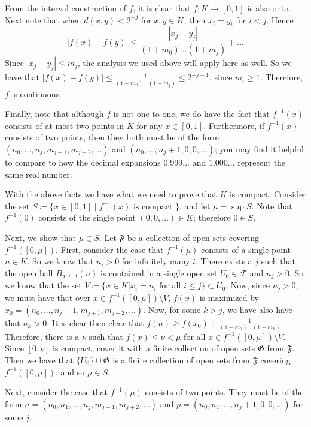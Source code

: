From the interval construction of \(f\), it is clear that \(f: K \to [0, 1]\) is also onto. Next note that
when \(d(x, y) < 2^{-j}\) for \(x,y \in K\), then \(x_i = y_i\) for \(i < j\). Hence
\begin{equation}
|f(x) - f(y)| \leq \frac{|x_j - y_j|}{(1 + m_0)...(1 + m_j)} + ...
\end{equation} 
Since \(|x_j - y_j| \leq m_j\), the analysis we used above will apply here as well. So we have that
\(|f(x) - f(y)| \leq \frac{1}{(1 + m_0)...(1 + m_j)} \leq 2^{-j-1}\), since \(m_i \geq 1\). Therefore,
\(f\) is continuous.

Finally, note that although \(f\) is not one to one, we do have the fact that \(f^{-1}(x)\) consists of at most
two points in \(K\) for any \(x \in [0, 1]\). Furthermore, if \(f^{-1}(x)\) consists of two points, then
they both must be of the form
\((n_0, ..., n_j, m_{j+1}, m_{j+2}, ...)\) and \((n_0, ..., n_j + 1, 0, 0, ...)\);
you may find it helpful to compare to how the decimal expansions \(0.999...\) and \(1.000...\)
represent the same real number.

With the above facts we have what we need to prove that \(K\) is compact. Consider the set
\(S \coloneqq \{x \in [0, 1] \mid f^{-1}(x) \text{ is compact }\}\), and let \(\mu = \sup S\). Note that
\(f^{-1}(0)\) consists of the single point \((0,0,...)\in K\); therefore \(0 \in S\). 

Next, we show that \(\mu \in S\). Let \(\mathfrak F\) be a collection of open sets covering \(f^{-1}([0, \mu])\).
First, consider the case that \(f^{-1}(\mu)\) consists of a single point \(n \in K\). So we know that
\(n_i > 0\) for infinitely many \(i\). There exists a \(j\) such that the open ball \(B_{2^{-j-1}}(n)\) is
contained in a single open set \(U_0 \in \mathcal F\) and \(n_j > 0\). So we know that the set 
\(V \coloneqq \{x \in K | x_i = n_i \text{ for all } i\leq j\} \subset U_0\). Now, since \(n_j > 0\), we
must have that over \(x \in f^{-1}([0, \mu]) \setminus V\), \(f(x)\) is maximized by 
\(x_0 = (n_0, ..., n_j - 1, m_{j+1}, m_{j+2}, ...)\). Now, for some \(k > j\), we have also have that \(n_k > 0\).
It is clear then clear that \(f(n) \geq f(x_0) + \frac{1}{(1+m_0)...(1+m_k)}\). Therefore, there is a
\(\nu\) such that \(f(x) \leq \nu < \mu\) for all \(x \in f^{-1}([0, \mu]) \setminus V\).
Since \([0, \nu]\) is compact, cover it with a
finite collection of open sets \(\mathfrak G\) from \(\mathfrak F\). Then we have that
\(\{U_0\} \cup \mathfrak G\) is a finite collection of open sets from \(\mathfrak F\) covering
\(f^{-1}([0, \mu])\), and so \(\mu \in S\). 

Next, consider the case that \(f^{-1}(\mu)\) consists of two points. They must be of the form
\(n = (n_0, n_1, ..., n_j, m_{j+1}, m_{j+2}, ...)\) and \(p = (n_0, n_1, ..., n_j + 1, 0, 0, ...)\)
for some \(j\). 

